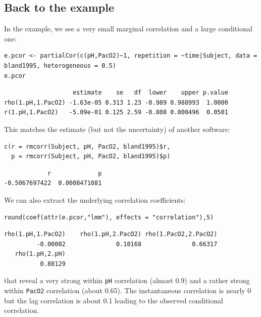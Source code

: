 \documentclass[12pt]{article}
\begin{document}
\clearpage

\subsection{Back to the example}
\label{sec:org4cb0eea}

In the example, we see a very small marginal correlation and a large conditional one:
\lstset{language=r,label= ,caption= ,captionpos=b,numbers=none}
\begin{lstlisting}
e.pcor <- partialCor(c(pH,PacO2)~1, repetition = ~time|Subject, data = bland1995, heterogeneous = 0.5)
e.pcor
\end{lstlisting}

\begin{verbatim}
                   estimate    se   df  lower    upper p.value
rho(1.pH,1.PacO2) -1.63e-05 0.313 1.23 -0.989 0.988993  1.0000
r(1.pH,1.PacO2)   -5.09e-01 0.125 2.59 -0.808 0.000496  0.0501
\end{verbatim}


This matches the estimate (but not the uncertainty) of another software:
\lstset{language=r,label= ,caption= ,captionpos=b,numbers=none}
\begin{lstlisting}
c(r = rmcorr(Subject, pH, PacO2, bland1995)$r,
  p = rmcorr(Subject, pH, PacO2, bland1995)$p)
\end{lstlisting}

\begin{verbatim}
            r             p 
-0.5067697422  0.0008471081
\end{verbatim}


We can also extract the underlying correlation coefficients:
\lstset{language=r,label= ,caption= ,captionpos=b,numbers=none}
\begin{lstlisting}
round(coef(attr(e.pcor,"lmm"), effects = "correlation"),5)
\end{lstlisting}

\begin{verbatim}
rho(1.pH,1.PacO2)    rho(1.pH,2.PacO2) rho(1.PacO2,2.PacO2) 
         -0.00002              0.10168              0.66317 
   rho(1.pH,2.pH) 
          0.88129
\end{verbatim}


that reveal a very strong within \texttt{pH} correlation (almost 0.9) and a
rather strong within \texttt{PacO2} correlation (about 0.65). The
instantaneous correlation is nearly 0 but the lag correlation is about
0.1 leading to the observed conditional correlation.
\end{document}
